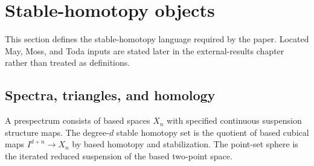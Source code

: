 \section{Stable-homotopy objects}
\label{chap:stable-background}

This section defines the stable-homotopy language required by the paper.  Located May, Moss, and Toda inputs are stated later in the external-results chapter rather than treated as definitions.

\subsection{Spectra, triangles, and homology}

\begin{definition}
  \label{def:point-set-prespectrum}
  \leanok
  A prespectrum consists of based spaces $X_n$ with specified continuous
  suspension structure maps. The degree-$d$ stable homotopy set is the
  quotient of based cubical maps $I^{d+n}\to X_n$ by based homotopy and
  stabilization. The point-set sphere is the iterated reduced suspension
  of the based two-point space.
\end{definition}

